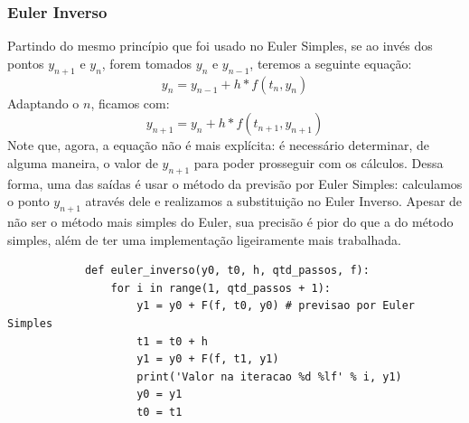 \documentclass{article}
\begin{document}
\begin{otherlanguage}{brazil}
        \subsubsection{Euler Inverso}
            Partindo do mesmo princípio que foi usado no Euler Simples, se ao invés dos pontos $y_{n+1}$ e $y_{n}$, forem tomados $y_n$ e $y_{n-1}$, teremos a seguinte equação:\newline
            \begin{equation}
                y_{n} = y_{n-1} + h * f(t_{n}, y_{n})
            \end{equation}
            Adaptando o $n$, ficamos com:
            \begin{equation}
                y_{n+1} = y_n + h * f(t_{n+1}, y_{n+1})
            \end{equation}
            Note que, agora, a equação não é mais explícita: é necessário determinar, de alguma maneira, o valor de $y_{n+1}$ para poder prosseguir com os cálculos. Dessa forma, uma das saídas é usar o método da previsão por Euler Simples: calculamos o ponto $y_{n+1}$ através dele e realizamos a substituição no Euler Inverso. Apesar de não ser o método mais simples do Euler, sua precisão é pior do que a do método simples, além de ter uma implementação ligeiramente mais trabalhada.\newline
            \begin{lstlisting}
            def euler_inverso(y0, t0, h, qtd_passos, f):
                for i in range(1, qtd_passos + 1):
                    y1 = y0 + F(f, t0, y0) # previsao por Euler Simples
                    t1 = t0 + h
                    y1 = y0 + F(f, t1, y1)
                    print('Valor na iteracao %d %lf' % i, y1)
                    y0 = y1
                    t0 = t1
            \end{lstlisting}

\end{otherlanguage}
\end{document}
